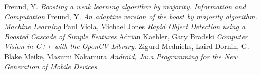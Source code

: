 
\begin{thebibliography}{1}
 Freund, Y. {\em Boosting a weak learning algorithm by majority. Information and Computation}
 Freund, Y. {\em An adaptive version of the boost by majority algorithm. Machine Learning}
 Paul Viola, Michael Jones {\em Rapid Object Detection using a Boosted Cascade of Simple Features}
 Adrian Kaehler, Gary Bradski {\em Computer Vision in C++ with the OpenCV Library}.
 Zigurd Mednieks, Laird Dornin, G. Blake Meike, Masumi Nakamura {\em Android, Java Programming for the New Generation of Mobile Devices}.


\end{thebibliography}


